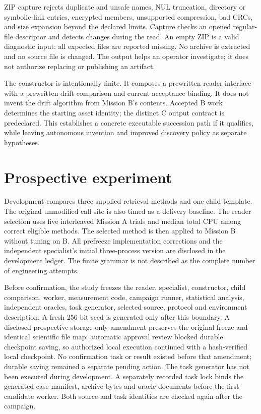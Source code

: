 \documentclass[11pt,a4paper]{article}
\begin{document}
ZIP capture rejects duplicate and unsafe names, NUL truncation, directory or symbolic-link entries, encrypted members, unsupported compression, bad CRCs, and size expansion beyond the declared limits. Capture checks an opened regular-file descriptor and detects changes during the read. An empty ZIP is a valid diagnostic input: all expected files are reported missing. No archive is extracted and no source file is changed. The output helps an operator investigate; it does not authorize replacing or publishing an artifact.

The constructor is intentionally finite. It composes a prewritten reader interface with a prewritten drift comparison and current acceptance binding. It does not invent the drift algorithm from Mission B's contents. Accepted B work determines the starting asset identity; the distinct C output contract is predeclared. This establishes a concrete executable succession path if it qualifies, while leaving autonomous invention and improved discovery policy as separate hypotheses.

\section{Prospective experiment}
\label{sec:experiment}

Development compares three supplied retrieval methods and one child template. The original unmodified call site is also timed as a delivery baseline. The reader selection uses five interleaved Mission A trials and median total CPU among correct eligible methods. The selected method is then applied to Mission B without tuning on B. All prefreeze implementation corrections and the independent specialist's initial three-process version are disclosed in the development ledger. The finite grammar is not described as the complete number of engineering attempts.

Before confirmation, the study freezes the reader, specialist, constructor, child comparison, worker, measurement code, campaign runner, statistical analysis, independent oracles, task generator, selected source, protocol and environment description. A fresh 256-bit seed is generated only after this boundary. A disclosed prospective storage-only amendment preserves the original freeze and identical scientific file map: automatic approval review blocked durable checkpoint saving, so authorized local execution continued with a hash-verified local checkpoint. No confirmation task or result existed before that amendment; durable saving remained a separate pending action. The task generator has not been executed during development. A separately recorded task lock binds the generated case manifest, archive bytes and oracle documents before the first candidate worker. Both source and task identities are checked again after the campaign.
\end{document}
